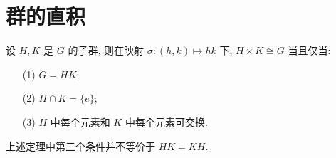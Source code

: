 \section{群的直积}

\begin{theorem}
	设 $H,K$ 是 $G$ 的子群, 则在映射 $\sigma:(h,k)\mapsto hk$ 下, $H\times K\cong G$ 当且仅当:\begin{itemize}
		\item[(1)] $G=HK$;
		\item[(2)] $H\cap K=\{e\}$;
		\item[(3)] $H$ 中每个元素和 $K$ 中每个元素可交换.
	\end{itemize}
\end{theorem}

\begin{remark*}
	上述定理中第三个条件并不等价于 $HK=KH$.
\end{remark*}